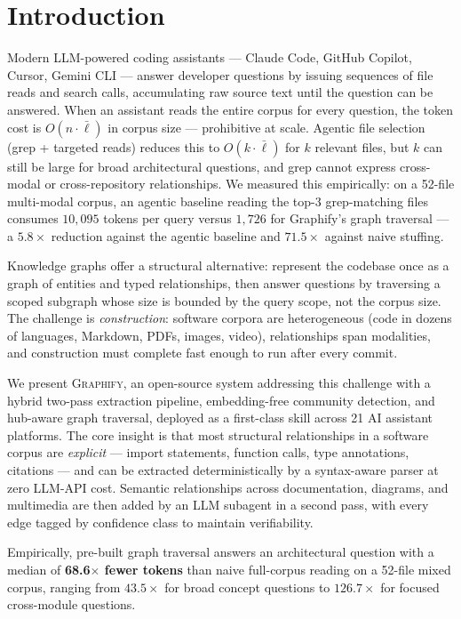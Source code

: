 \section{Introduction}

Modern LLM-powered coding assistants --- Claude Code, GitHub Copilot, Cursor,
Gemini CLI --- answer developer questions by issuing sequences of file reads
and search calls, accumulating raw source text until the question can be
answered. When an assistant reads the entire corpus for every question, the token cost
is $O(n \cdot \bar{\ell})$ in corpus size --- prohibitive at scale. Agentic
file selection (grep + targeted reads) reduces this to $O(k \cdot \bar{\ell})$
for $k$ relevant files, but $k$ can still be large for broad architectural
questions, and grep cannot express cross-modal or cross-repository
relationships. We measured this empirically: on a 52-file multi-modal corpus,
an agentic baseline reading the top-3 grep-matching files consumes
$10{,}095$ tokens per query versus $1{,}726$ for Graphify's graph traversal
--- a $5.8\times$ reduction against the agentic baseline and $71.5\times$
against naive stuffing.

Knowledge graphs offer a structural alternative: represent the codebase once
as a graph of entities and typed relationships, then answer questions by
traversing a scoped subgraph whose size is bounded by the query scope, not the
corpus size. The challenge is \emph{construction}: software corpora are
heterogeneous (code in dozens of languages, Markdown, PDFs, images, video),
relationships span modalities, and construction must complete fast enough to
run after every commit.

We present \textsc{Graphify}, an open-source system addressing this challenge
with a hybrid two-pass extraction pipeline, embedding-free community detection,
and hub-aware graph traversal, deployed as a first-class skill across 21 AI
assistant platforms. The core insight is that most structural relationships in
a software corpus are \emph{explicit} --- import statements, function calls,
type annotations, citations --- and can be extracted deterministically by a
syntax-aware parser at zero LLM-API cost. Semantic relationships across
documentation, diagrams, and multimedia are then added by an LLM subagent in
a second pass, with every edge tagged by confidence class to maintain
verifiability.

Empirically, pre-built graph traversal answers an architectural question with
a median of \textbf{68.6$\times$ fewer tokens} than naive full-corpus reading
on a 52-file mixed corpus, ranging from $43.5\times$ for broad concept
questions to $126.7\times$ for focused cross-module questions.

